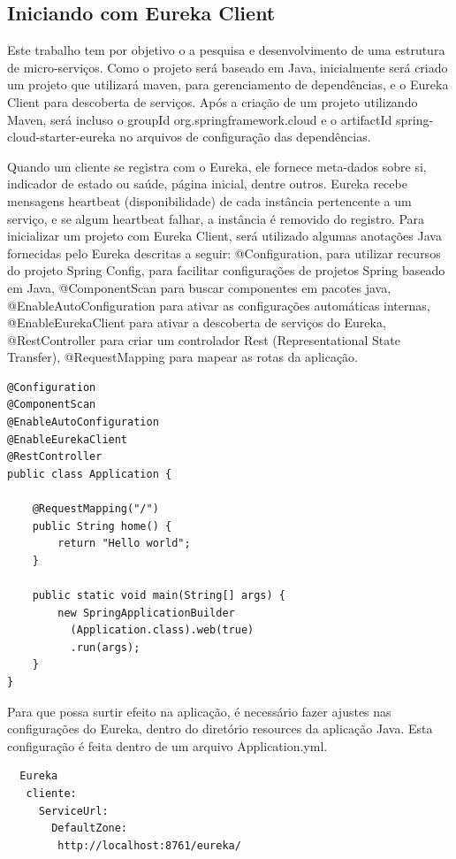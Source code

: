 \documentclass[journal]{IEEEtran}
\begin{document}
\subsection{Iniciando com Eureka Client}

Este trabalho tem por objetivo o a pesquisa e desenvolvimento de uma estrutura de micro-serviços. Como o projeto será baseado em Java, inicialmente será criado um projeto que utilizará maven, para gerenciamento de dependências, e o Eureka Client para descoberta de serviços. Após a criação de um projeto utilizando Maven, será incluso o groupId org.springframework.cloud e o artifactId spring-cloud-starter-eureka no arquivos de configuração das dependências.

Quando um cliente se registra com o Eureka, ele fornece meta-dados sobre si, indicador de estado ou saúde, página inicial, dentre outros. Eureka recebe mensagens heartbeat (disponibilidade) de cada instância pertencente a um serviço, e se algum heartbeat falhar, a instância é removido do registro.
Para inicializar um projeto com Eureka Client, será utilizado algumas anotações Java fornecidas pelo Eureka descritas a seguir: @Configuration, para utilizar recursos do projeto Spring Config, para facilitar configurações de projetos Spring baseado em Java, @ComponentScan para buscar componentes em pacotes java, @EnableAutoConfiguration para ativar as configurações automáticas internas, @EnableEurekaClient para ativar a descoberta de serviços do Eureka, @RestController para criar um controlador Rest (Representational State Transfer), @RequestMapping para mapear as rotas da aplicação.

\begin{verbatim}
@Configuration
@ComponentScan
@EnableAutoConfiguration
@EnableEurekaClient
@RestController
public class Application {

    @RequestMapping("/")
    public String home() {
        return "Hello world";
    }

    public static void main(String[] args) {
        new SpringApplicationBuilder
          (Application.class).web(true)
          .run(args);
    }
}
\end{verbatim}

Para que possa surtir efeito na aplicação, é necessário fazer ajustes nas configurações do Eureka, dentro do diretório resources da aplicação Java. Esta configuração é feita dentro de um arquivo Application.yml.

\begin{verbatim}
  Eureka
   cliente:
     ServiceUrl:
       DefaultZone: 
        http://localhost:8761/eureka/ 
\end{verbatim}
\end{document}
